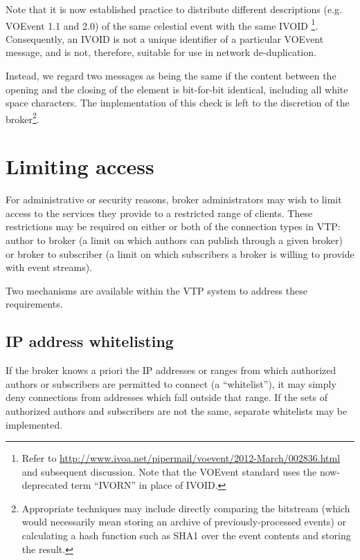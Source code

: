\documentclass[a4paper,11pt]{ivoa}
\begin{document}
Note that it is now established practice to distribute different descriptions
(e.g. VOEvent 1.1 and 2.0) of the same celestial event with the same IVOID
\footnote{Refer to
\url{http://www.ivoa.net/pipermail/voevent/2012-March/002836.html} and
subsequent discussion. Note that the VOEvent standard uses the now-deprecated
term “IVORN” in place of IVOID.}. Consequently, an IVOID is not a unique
identifier of a particular VOEvent message, and is not, therefore, suitable
for use in network de-duplication.

Instead, we regard two messages as being the same if the content between the
opening \xmlel{<} and the closing \xmlel{>} of the 
element is bit-for-bit identical, including all white space characters. The
implementation of this check is left to the discretion of the broker\footnote{
Appropriate techniques may include directly comparing the bitstream (which
would necessarily mean storing an archive of previously-processed events) or
calculating a hash function such as SHA1 \citep{Eastlake:2001} over the event
contents and storing the result.}.

\section{Limiting access}
\label{sec:limit}

For administrative or security reasons, broker administrators may wish to
limit access to the services they provide to a restricted range of clients.
These restrictions may be required on either or both of the connection types
in VTP: author to broker (a limit on which authors can publish through a given
broker) or broker to subscriber (a limit on which subscribers a broker is
willing to provide with event streams).

Two mechanisms are available within the VTP system to address these
requirements.

\subsection{IP address whitelisting}
\label{sec:limit:whitelist}

If the broker knows a priori the IP addresses or ranges from which authorized
authors or subscribers are permitted to connect (a ``whitelist''), it may
simply deny connections from addresses which fall outside that range. If the
sets of authorized authors and subscribers are not the same, separate
whitelists may be implemented.
\end{document}
